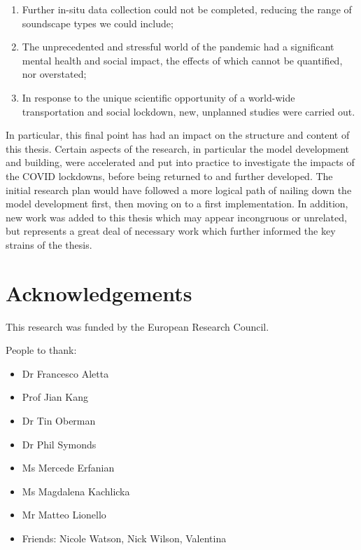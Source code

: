 \documentclass[twoside,fontsize=12pt,titlepage]{scrbook}
\begin{document}
\begin{enumerate}
    \item Further in-situ data collection could not be completed, reducing the range of soundscape types we could include;
    \item The unprecedented and stressful world of the pandemic had a significant mental health and social impact, the effects of which cannot be quantified, nor overstated;
    \item In response to the unique scientific opportunity of a world-wide transportation and social lockdown, new, unplanned studies were carried out. 
\end{enumerate}

In particular, this final point has had an impact on the structure and content of this thesis. Certain aspects of the research, in particular the model development and building, were accelerated and put into practice to investigate the impacts of the COVID lockdowns, before being returned to and further developed. The initial research plan would have followed a more logical path of nailing down the model development first, then moving on to a first implementation. In addition, new work was added to this thesis which may appear incongruous or unrelated, but represents a great deal of necessary work which further informed the key strains of the thesis. 

\chapter*{Acknowledgements}
This research was funded by the European Research Council.

People to thank:
\begin{itemize}
    \item Dr Francesco Aletta
    \item Prof Jian Kang
    \item Dr Tin Oberman
    \item Dr Phil Symonds
    \item Ms Mercede Erfanian
    \item Ms Magdalena Kachlicka
    \item Mr Matteo Lionello
    \item Friends: Nicole Watson, Nick Wilson, Valentina 
\end{itemize}


\tableofcontents
\listoffigures
\listoftables
\end{document}
